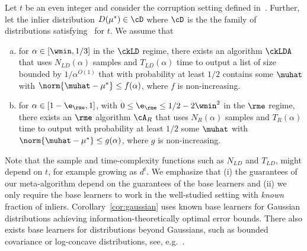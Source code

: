 \begin{assumption}
\label{asm:algs}
Let \(t\) be an even integer and consider the corruption setting defined in~. Further, let the inlier distribution \(D(\mu^{\ast}) \in \cD\) where \(\cD\) is the 
the family of distributions satisfying~ for \(t\).
We assume that 
\begin{enumerate}[(a)]
    \item \label{asm:alg-ld} %
    for \(\alpha \in [\wmin, 1/3]\) in the \(\ckLD\) regime, there exists an algorithm $\ckLDA$ 
    that uses $N_{LD}(\alpha)$ samples and $T_{LD}(\alpha)$ time to output a list of size bounded by $1/\alpha^{O(1)}$  that with probability at least $1/2$ contains some $\muhat$ with $\norm{\muhat-\mu^*} \leq f(\alpha)$, where \(f\) is non-increasing.
    
    \item \label{asm:alg-rme} for $\alpha \in [1 - \e_{\rme}, 1]$, with \(0 \leq \e_{\rme} \leq 1/2 - 2\wmin^2 \) in the \(\rme\) regime, there exists an \(\rme\) algorithm $\cA_R$ 
    that uses $N_R(\alpha)$ samples and $T_{R}(\alpha)$ time to output with probability at least $1/2$ some $\muhat$ with $\norm{\muhat-\mu^*} \leq g(\alpha)$,
    where \(g\) is non-increasing. 
\end{enumerate}
\end{assumption}

Note that the sample and time-complexity functions such as \(N_{LD}\) and \(T_{LD}\), might depend on \(t\), for example growing as \(d^t\).
We emphasize that (i) the guarantees of our meta-algorithm depend on the guarantees of the base learners and
(ii) we only require the base learners to work in the well-studied setting with \emph{known} fraction of inliers.
Corollary~\ref{cor:gaussian} uses known base learners for Gaussian distributions achieving information-theoretically optimal error bounds.
There  also exists base learners for distributions beyond Gaussians, such as bounded covariance or log-concave distributions, see, e.g.~\cite{kothari2018robust}.
